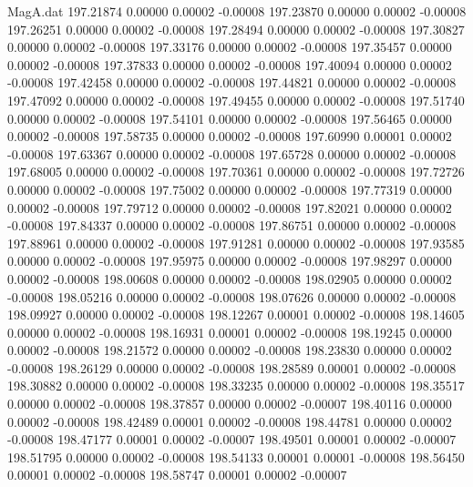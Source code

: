 \begin{filecontents}{MagA.dat}
 197.21874    0.00000    0.00002   -0.00008
 197.23870    0.00000    0.00002   -0.00008
 197.26251    0.00000    0.00002   -0.00008
 197.28494    0.00000    0.00002   -0.00008
 197.30827    0.00000    0.00002   -0.00008
 197.33176    0.00000    0.00002   -0.00008
 197.35457    0.00000    0.00002   -0.00008
 197.37833    0.00000    0.00002   -0.00008
 197.40094    0.00000    0.00002   -0.00008
 197.42458    0.00000    0.00002   -0.00008
 197.44821    0.00000    0.00002   -0.00008
 197.47092    0.00000    0.00002   -0.00008
 197.49455    0.00000    0.00002   -0.00008
 197.51740    0.00000    0.00002   -0.00008
 197.54101    0.00000    0.00002   -0.00008
 197.56465    0.00000    0.00002   -0.00008
 197.58735    0.00000    0.00002   -0.00008
 197.60990    0.00001    0.00002   -0.00008
 197.63367    0.00000    0.00002   -0.00008
 197.65728    0.00000    0.00002   -0.00008
 197.68005    0.00000    0.00002   -0.00008
 197.70361    0.00000    0.00002   -0.00008
 197.72726    0.00000    0.00002   -0.00008
 197.75002    0.00000    0.00002   -0.00008
 197.77319    0.00000    0.00002   -0.00008
 197.79712    0.00000    0.00002   -0.00008
 197.82021    0.00000    0.00002   -0.00008
 197.84337    0.00000    0.00002   -0.00008
 197.86751    0.00000    0.00002   -0.00008
 197.88961    0.00000    0.00002   -0.00008
 197.91281    0.00000    0.00002   -0.00008
 197.93585    0.00000    0.00002   -0.00008
 197.95975    0.00000    0.00002   -0.00008
 197.98297    0.00000    0.00002   -0.00008
 198.00608    0.00000    0.00002   -0.00008
 198.02905    0.00000    0.00002   -0.00008
 198.05216    0.00000    0.00002   -0.00008
 198.07626    0.00000    0.00002   -0.00008
 198.09927    0.00000    0.00002   -0.00008
 198.12267    0.00001    0.00002   -0.00008
 198.14605    0.00000    0.00002   -0.00008
 198.16931    0.00001    0.00002   -0.00008
 198.19245    0.00000    0.00002   -0.00008
 198.21572    0.00000    0.00002   -0.00008
 198.23830    0.00000    0.00002   -0.00008
 198.26129    0.00000    0.00002   -0.00008
 198.28589    0.00001    0.00002   -0.00008
 198.30882    0.00000    0.00002   -0.00008
 198.33235    0.00000    0.00002   -0.00008
 198.35517    0.00000    0.00002   -0.00008
 198.37857    0.00000    0.00002   -0.00007
 198.40116    0.00000    0.00002   -0.00008
 198.42489    0.00001    0.00002   -0.00008
 198.44781    0.00000    0.00002   -0.00008
 198.47177    0.00001    0.00002   -0.00007
 198.49501    0.00001    0.00002   -0.00007
 198.51795    0.00000    0.00002   -0.00008
 198.54133    0.00001    0.00001   -0.00008
 198.56450    0.00001    0.00002   -0.00008
 198.58747    0.00001    0.00002   -0.00007

\end{filecontents}
